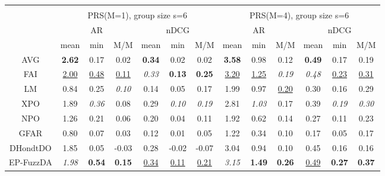 \begin{tabular}{ c | c c c | c c c || c c c | c c c}
\multicolumn{12}{c}{} \\
\multicolumn{1}{c}{} & \multicolumn{6}{c}{PRS(M=1), group size s=6} & \multicolumn{6}{c}{PRS(M=4), group size s=6} \\
\multicolumn{1}{c}{} & \multicolumn{3}{c}{AR} & \multicolumn{3}{c}{nDCG} & \multicolumn{3}{c}{AR} & \multicolumn{3}{c}{nDCG} \\
& mean & min & M/M & mean & min & M/M & mean & min & M/M & mean & min & M/M \\
\hline
AVG & \textbf{2.62} & 0.17 & 0.02 & \textbf{0.34} & 0.02 & 0.02 & \textbf{3.58} & 0.98 & 0.12 & \textbf{0.49} & 0.17 & 0.19 \\
FAI & \underline{2.00} & \underline{0.48} & \underline{0.11} & \textit{0.33} & \textbf{0.13} & \textbf{0.25} & \underline{3.20} & \underline{1.25} & \textit{0.19} & \textit{0.48} & \underline{0.23} & \underline{0.31} \\
LM & 0.84 & 0.25 & \textit{0.10} & 0.14 & 0.05 & 0.17 & 1.99 & 0.97 & \underline{0.20} & 0.30 & 0.16 & 0.29 \\
XPO & 1.89 & \textit{0.36} & 0.08 & 0.29 & \textit{0.10} & \textit{0.19} & 2.81 & \textit{1.03} & 0.17 & 0.39 & \textit{0.19} & \textit{0.30} \\
NPO & 1.26 & 0.21 & 0.06 & 0.20 & 0.04 & 0.11 & 1.92 & 0.62 & 0.14 & 0.27 & 0.11 & 0.23 \\
GFAR & 0.80 & 0.07 & 0.03 & 0.12 & 0.01 & 0.05 & 1.22 & 0.34 & 0.10 & 0.17 & 0.05 & 0.17 \\
DHondtDO & 1.85 & 0.05 & -0.03 & 0.28 & -0.02 & -0.07 & 3.04 & 0.94 & 0.10 & 0.45 & 0.16 & 0.16 \\
EP-FuzzDA & \textit{1.98} & \textbf{0.54} & \textbf{0.15} & \underline{0.34} & \underline{0.11} & \underline{0.21} & \textit{3.15} & \textbf{1.49} & \textbf{0.26} & \underline{0.49} & \textbf{0.27} & \textbf{0.37} \\


\end{tabular}

